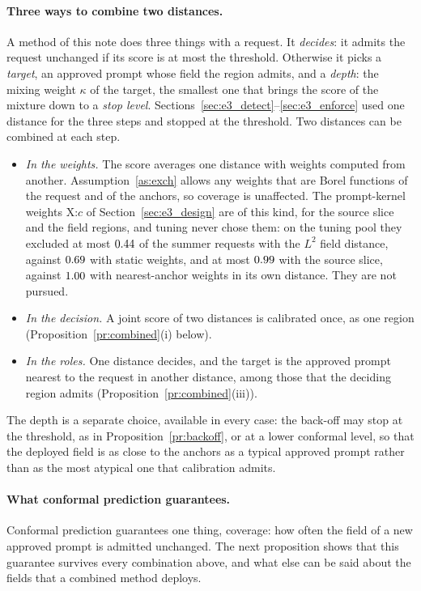 \documentclass{article}
\theoremstyle{plain}
\theoremstyle{remark}
\begin{document}
\paragraph{Three ways to combine two distances.}
A method of this note does three things with a request. It \emph{decides}: it admits the request unchanged if its score is at
most the threshold. Otherwise it picks a \emph{target}, an approved prompt whose field the region admits, and a \emph{depth}: the
mixing weight $\kappa$ of the target, the smallest one that brings the score of the mixture down to a \emph{stop level}.
Sections~\ref{sec:e3_detect}--\ref{sec:e3_enforce} used one distance for the three steps and stopped at the threshold. Two distances
can be combined at each step.
\begin{itemize}
\item \emph{In the weights.} The score averages one distance with weights computed from another. Assumption~\ref{as:exch} allows any
weights that are Borel functions of the request and of the anchors, so coverage is unaffected. The prompt-kernel weights X:$c$ of
Section~\ref{sec:e3_design} are of this kind, for the source slice and the field regions, and tuning never chose them: on the tuning
pool they excluded at most $0.44$ of the summer requests with the $L^2$ field distance, against $0.69$ with static
weights, and at most $0.99$ with the source slice, against $1.00$ with nearest-anchor weights in its own distance.
They are not pursued.
\item \emph{In the decision.} A joint score of two distances is calibrated once, as one region (Proposition~\ref{pr:combined}(i)
below).
\item \emph{In the roles.} One distance decides, and the target is the approved prompt nearest to the request in another distance,
among those that the deciding region admits (Proposition~\ref{pr:combined}(iii)).
\end{itemize}
The depth is a separate choice, available in every case: the back-off may stop at the threshold, as in Proposition~\ref{pr:backoff},
or at a lower conformal level, so that the deployed field is as close to the anchors as a typical approved prompt rather than as
the most atypical one that calibration admits.

\paragraph{What conformal prediction guarantees.}
Conformal prediction guarantees one thing, coverage: how often the field of a new approved prompt is admitted unchanged. The
next proposition shows that this guarantee survives every combination above, and what else can be said about the fields that a
combined method deploys.
\end{document}
